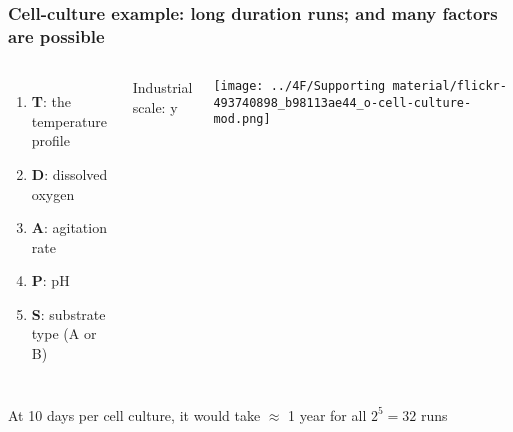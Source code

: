 \begin{frame}\frametitle{Cell-culture example: long duration runs; and many factors are possible}
	\newcommand{\white}{\color{white}}
	\begin{columns}[c]
			\begin{enumerate}
				\item	\textbf{T}: the temperature profile
				\item	\textbf{D}: dissolved oxygen
				\item	\textbf{A}: agitation rate
				\item	\textbf{P}: pH
				\item	\textbf{S}: substrate type (A or B)
			\end{enumerate}
		
			{\color{blue} \small Industrial scale: {\color{white}y}}   
			
			\vspace{0.2cm}
			
			\centerline{\texttt{[image: ../4F/Supporting material/flickr-493740898\_b98113ae44\_o-cell-culture-mod.png]}}
	\end{columns}

	\vfill
	At 10 days per cell culture, it would take $\approx$ 1 year for all $2^5 = 32$ runs
	
\end{frame}

